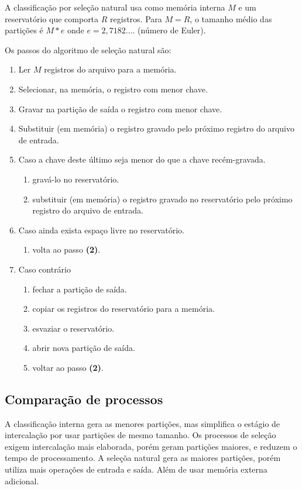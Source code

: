 A classificação por seleção natural usa como memória interna $M$ e um reservatório
que comporta $R$ registros.
Para $M = R$, o tamanho médio das partições é $M * e$ onde $e = 2,7182....$
(número de Euler).

Os passos do algoritmo de seleção natural são:
\begin{enumerate}
\item Ler $M$ registros do arquivo para a memória.
\item Selecionar, na memória, o registro com menor chave.
\item Gravar na partição de saída o registro com menor chave.
\item Substituir (em memória) o registro gravado pelo próximo registro
do arquivo de entrada.
\item Caso a chave deste último seja menor do que a chave recém-gravada.
	\begin{enumerate}
	\item gravá-lo no reservatório.
	\item substituir (em memória) o registro gravado no reservatório pelo
	próximo registro do arquivo de entrada.
	\end{enumerate}
\item Caso ainda exista espaço livre no reservatório.
	\begin{enumerate}
	\item volta ao passo {\bf (2)}.
	\end{enumerate}
\item Caso contrário
	\begin{enumerate}
	\item fechar a partição de saída.
	\item copiar os registros do reservatório para a memória.
	\item esvaziar o reservatório.
	\item abrir nova partição de saída.
	\item voltar ao passo {\bf (2)}.
	\end{enumerate}
\end{enumerate}

\subsection{Comparação de processos}

A classificação interna gera as menores partições, mas simplifica o estágio
de intercalação por usar partições de mesmo tamanho.
Os processos de seleção exigem intercalação mais elaborada, porém geram 
partições maiores, e reduzem o tempo de processamento.
A seleçõa natural gera as maiores partições, porém utiliza mais operações de 
entrada e saída. Além de usar memória externa adicional.

